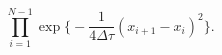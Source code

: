 \begin{equation} 
\prod_{i=1}^{N-1} \exp \biggl\{ 
-\frac{1}{4\Delta\tau} (x_{i+1}-x_i)^2 \biggr\}. \label{gm} 
\end{equation}


